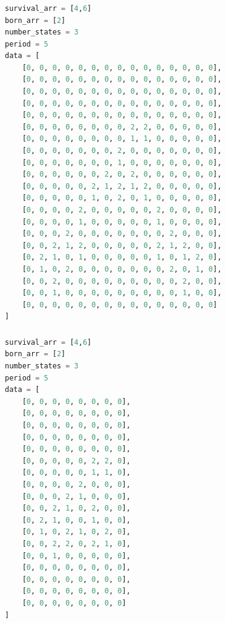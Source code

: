 \documentclass[12pt]{article}
\numberwithin{figure}{section} %
\begin{document}
\subsubsection{}
\begin{lstlisting}[language = Python]
survival_arr = [4,6]
born_arr = [2]
number_states = 3
period = 5
data = [
    [0, 0, 0, 0, 0, 0, 0, 0, 0, 0, 0, 0, 0, 0, 0],
    [0, 0, 0, 0, 0, 0, 0, 0, 0, 0, 0, 0, 0, 0, 0],
    [0, 0, 0, 0, 0, 0, 0, 0, 0, 0, 0, 0, 0, 0, 0],
    [0, 0, 0, 0, 0, 0, 0, 0, 0, 0, 0, 0, 0, 0, 0],
    [0, 0, 0, 0, 0, 0, 0, 0, 0, 0, 0, 0, 0, 0, 0],
    [0, 0, 0, 0, 0, 0, 0, 0, 2, 2, 0, 0, 0, 0, 0],
    [0, 0, 0, 0, 0, 0, 0, 0, 1, 1, 0, 0, 0, 0, 0],
    [0, 0, 0, 0, 0, 0, 0, 2, 0, 0, 0, 0, 0, 0, 0],
    [0, 0, 0, 0, 0, 0, 0, 1, 0, 0, 0, 0, 0, 0, 0],
    [0, 0, 0, 0, 0, 0, 2, 0, 2, 0, 0, 0, 0, 0, 0],
    [0, 0, 0, 0, 0, 2, 1, 2, 1, 2, 0, 0, 0, 0, 0],
    [0, 0, 0, 0, 0, 1, 0, 2, 0, 1, 0, 0, 0, 0, 0],
    [0, 0, 0, 0, 2, 0, 0, 0, 0, 0, 2, 0, 0, 0, 0],
    [0, 0, 0, 0, 1, 0, 0, 0, 0, 0, 1, 0, 0, 0, 0],
    [0, 0, 0, 2, 0, 0, 0, 0, 0, 0, 0, 2, 0, 0, 0],
    [0, 0, 2, 1, 2, 0, 0, 0, 0, 0, 2, 1, 2, 0, 0],
    [0, 2, 1, 0, 1, 0, 0, 0, 0, 0, 1, 0, 1, 2, 0],
    [0, 1, 0, 2, 0, 0, 0, 0, 0, 0, 0, 2, 0, 1, 0],
    [0, 0, 2, 0, 0, 0, 0, 0, 0, 0, 0, 0, 2, 0, 0],
    [0, 0, 1, 0, 0, 0, 0, 0, 0, 0, 0, 0, 1, 0, 0],
    [0, 0, 0, 0, 0, 0, 0, 0, 0, 0, 0, 0, 0, 0, 0]
]
\end{lstlisting}

\subsubsection{}
\begin{lstlisting}[language = Python]
survival_arr = [4,6]
born_arr = [2]
number_states = 3
period = 5
data = [
    [0, 0, 0, 0, 0, 0, 0, 0],
    [0, 0, 0, 0, 0, 0, 0, 0],
    [0, 0, 0, 0, 0, 0, 0, 0],
    [0, 0, 0, 0, 0, 0, 0, 0],
    [0, 0, 0, 0, 0, 0, 0, 0],
    [0, 0, 0, 0, 0, 2, 2, 0],
    [0, 0, 0, 0, 0, 1, 1, 0],
    [0, 0, 0, 0, 2, 0, 0, 0],
    [0, 0, 0, 2, 1, 0, 0, 0],
    [0, 0, 2, 1, 0, 2, 0, 0],
    [0, 2, 1, 0, 0, 1, 0, 0],
    [0, 1, 0, 2, 1, 0, 2, 0],
    [0, 0, 2, 2, 0, 2, 1, 0],
    [0, 0, 1, 0, 0, 0, 0, 0],
    [0, 0, 0, 0, 0, 0, 0, 0],
    [0, 0, 0, 0, 0, 0, 0, 0],
    [0, 0, 0, 0, 0, 0, 0, 0],
    [0, 0, 0, 0, 0, 0, 0, 0]
]
\end{lstlisting}
\end{document}
